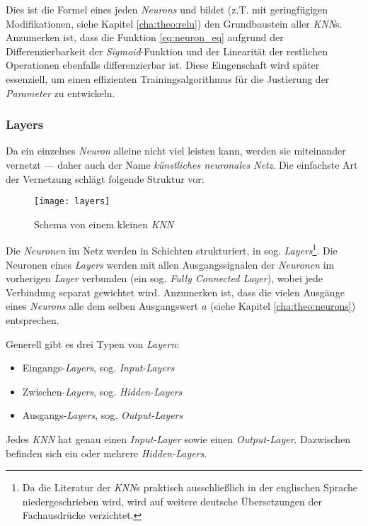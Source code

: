 Dies ist die Formel eines jeden \textit{Neurons} und bildet (z.T. mit geringfügigen Modifikationen, siehe Kapitel \ref{cha:theo:relu}) den Grundbaustein aller \textit{KNN}s.\\

Anzumerken ist, dass die Funktion \ref{eq:neuron_eq} aufgrund der Differenzierbarkeit der \textit{Sigmoid}-Funktion und der Linearität der restlichen Operationen ebenfalls differenzierbar ist. Diese Eingenschaft wird später essenziell, um einen effizienten Trainingsalgorithmus für die Justierung der \textit{Parameter} zu entwickeln.

\newpage

\subsubsection{Layers}\label{cha:theo:layers}

Da ein einzelnes \textit{Neuron} alleine nicht viel leisten kann, werden sie miteinander vernetzt --- daher auch der Name \textit{künstliches neuronales Netz}. Die einfachste Art der Vernetzung schlägt folgende Struktur vor:

\begin{figure}[h]
	\centering
	\texttt{[image: layers]}
	\caption[Schema von kleinem \textit{KNN}]{Schema von einem kleinen \textit{KNN}}
	\label{img:layers}
\end{figure}

Die \textit{Neuronen} im Netz werden in Schichten strukturiert, in sog. \textit{Layers}\footnote{Da die Literatur der \textit{KNN}s praktisch ausschließlich in der englischen Sprache niedergeschrieben wird, wird auf weitere deutsche Übersetzungen der Fachausdrücke verzichtet.}. Die Neuronen eines \textit{Layers} werden mit allen Ausgangssignalen der \textit{Neuronen} im vorherigen \textit{Layer} verbunden (ein sog. \textit{Fully Connected Layer}), wobei jede Verbindung separat gewichtet wird. Anzumerken ist, dass die vielen Ausgänge eines \textit{Neurons} alle dem selben Ausgangswert $a$ (siehe Kapitel \ref{cha:theo:neurons}) entsprechen. 

Generell gibt es drei Typen von \textit{Layern}:

\begin{itemize}
	\item Eingangs-\textit{Layers}, sog. \textit{Input-Layers}
	\item Zwischen-\textit{Layers}, sog. \textit{Hidden-Layers}
	\item Ausgangs-\textit{Layers}, sog. \textit{Output-Layers}
\end{itemize}
Jedes \textit{KNN} hat genau einen \textit{Input-Layer} sowie einen \textit{Output-Layer}. Dazwischen befinden sich ein oder mehrere \textit{Hidden-Layers}.

